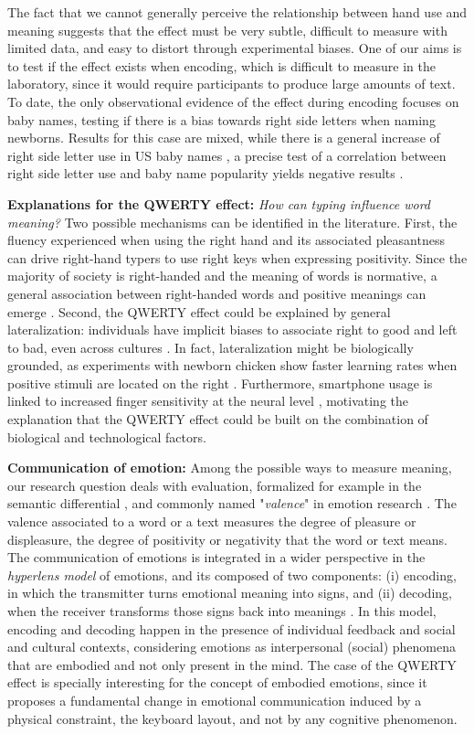 \documentclass[letterpaper]{sig-alternate-2013}
\begin{document}
The fact that we cannot generally perceive the relationship between hand use
and meaning suggests that the effect must be very subtle, difficult to measure
with limited data, and easy to distort through experimental biases. One of our
aims is to test if the effect exists when encoding, which is difficult to
measure in the laboratory, since it would require participants to produce
large amounts of text. To date, the only observational evidence of the effect
during encoding focuses on baby names, testing if there is a bias towards
right side letters when naming newborns. Results for this case are mixed,
while there is a general increase of right side letter use in US baby names
\cite{Casasanto2014}, a precise test of a correlation between right side
letter use and baby name popularity yields negative results
\cite{Thogmartin2013}.


\textbf{Explanations for the QWERTY effect:} \emph{How can typing influence
word meaning?} Two possible mechanisms can be identified in the literature.
First, the fluency experienced when using the right hand and its associated
pleasantness can drive right-hand typers to use right keys when expressing
positivity. Since the majority of society is right-handed and the meaning of
words is normative, a general association between right-handed words and
positive meanings can emerge \cite{Jasmin2012}. Second, the QWERTY effect
could be explained by general lateralization: individuals have implicit biases
to associate right to good and left to bad, even across cultures
\cite{Casasanto2014b}. In fact, lateralization might be biologically grounded,
as experiments with newborn chicken show faster learning rates when positive
stimuli are located on the right \cite{Vallortigara1996}. Furthermore,
smartphone usage is linked to increased finger sensitivity at the neural level
\cite{Gindrat2015}, motivating the explanation that the QWERTY effect could be
built on the combination of biological and technological factors.

\textbf{Communication of emotion:} Among the possible ways to measure meaning,
our research question deals with evaluation, formalized for example in the
semantic differential \cite{Osgood1964}, and commonly named "\emph{valence}"
in emotion research \cite{Russell1977,Scherer2005}. The valence associated to
a word or a text measures the degree of pleasure or displeasure, the degree of
positivity or negativity that the word or text means. The communication of
emotions is integrated in a wider perspective in the \emph{hyperlens model} of
emotions, and its composed of two components: (i) encoding, in which the
transmitter turns emotional meaning into signs, and (ii) decoding, when the
receiver transforms those signs back into meanings \cite{Kappas2013}. In this
model, encoding and decoding happen in the presence of individual feedback and
social and cultural contexts, considering emotions as interpersonal (social)
phenomena that are embodied and not only present in the mind. The case of the
QWERTY effect is specially interesting for the concept of embodied emotions,
since it proposes a fundamental change in emotional communication induced by a
physical constraint, the keyboard layout, and not by any cognitive phenomenon.
\end{document}
